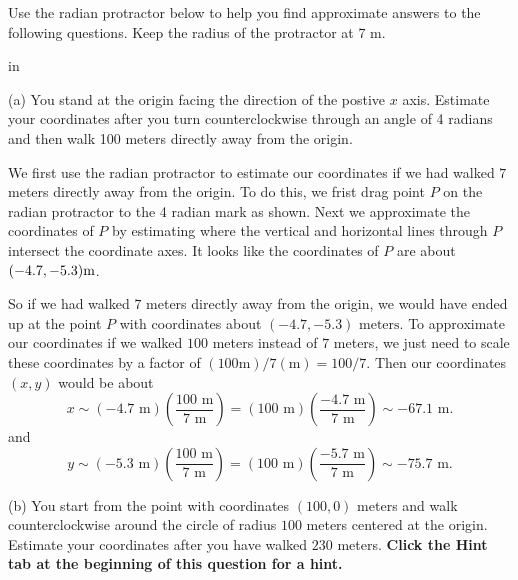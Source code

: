\documentclass{ximera}
\newcommand{\pskip}{\vskip 0.1 in}
\begin{document}
\begin{question}  \label{Q4P:Angles}
Use the radian protractor below to help you find approximate answers to the following questions. Keep the radius of the protractor at $7$ m.

\pskip

(a) You stand at the origin facing the direction of the postive $x$ axis. Estimate your coordinates after you turn counterclockwise through an angle of 4 radians and then walk 100 meters directly away from the origin.

\begin{explanation}
We first use the radian protractor to estimate our coordinates if we had walked $7$ meters directly away from the origin. To do this, we frist drag point $P$ on the radian protractor to the 4 radian mark as shown. Next we approximate the coordinates of $P$ by estimating where the vertical and horizontal lines through $P$ intersect the coordinate axes. It looks like the coordinates of $P$ are about $(-4.7, -5.3){\text m}$.

So if we had walked $7$ meters directly away from the origin, we would have ended up at the point $P$ with coordinates about $(-4.7, -5.3)\text{ meters}$. To approximate our coordinates if we walked $100$ meters instead of $7$ meters, we just need to scale these coordinates by a factor of $(100\text{m})/7(\text{m}) = 100/7$. Then our coordinates $(x,y)$ would be about
\[
   x \sim (-4.7\text{ m}) \left( \frac{100\text{ m}}{7\text{ m}} \right) = (100 \text{ m})\left( \frac{-4.7\text{ m}}{7\text{ m}}\right) \sim  -67.1 \text{ m}.
\]
and
\[
   y   \sim (-5.3\text{ m}) \left( \frac{100\text{ m}}{7\text{ m}} \right) = (100 \text{ m})\left( \frac{-5.7\text{ m}}{7\text{ m}}\right) \sim   -75.7 \text{ m}.
\]

 
\begin{onlineOnly}
    \begin{center}
\end{center}
\end{onlineOnly}


\end{explanation}

(b) You start from the point with coordinates $(100,0)$ meters and walk counterclockwise around the circle of radius $100$ meters centered at the origin. Estimate your coordinates after you have walked $230$ meters. {\bf Click the Hint tab at the beginning of this question for a hint.}


\end{question}
\end{document}
